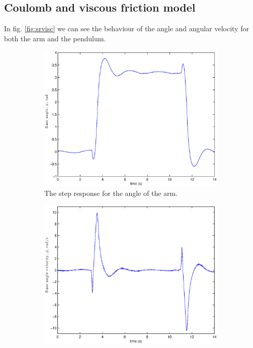 \documentclass[10pt,a4paper]{article}
\begin{document}
\subsection{Coulomb and viscous friction model}
In fig. \ref{fig:srvisc} we can see the behaviour of the angle and angular velocity for both the arm and the pendulum.
\begin{figure}[H]
\centering
		\begin{subfigure}[t]{0.49\textwidth}
			\includegraphics[width=1\textwidth]{plots/srphiint.eps}
			\centering
			\caption{The step response for the angle of the arm.}
			\label{subfigure:srviscphi}
		\end{subfigure}
		\begin{subfigure}[t]{0.49\textwidth}
			\includegraphics[width=1\textwidth]{plots/srphidotint.eps}

\end{subfigure}
\end{figure}
\end{document}
